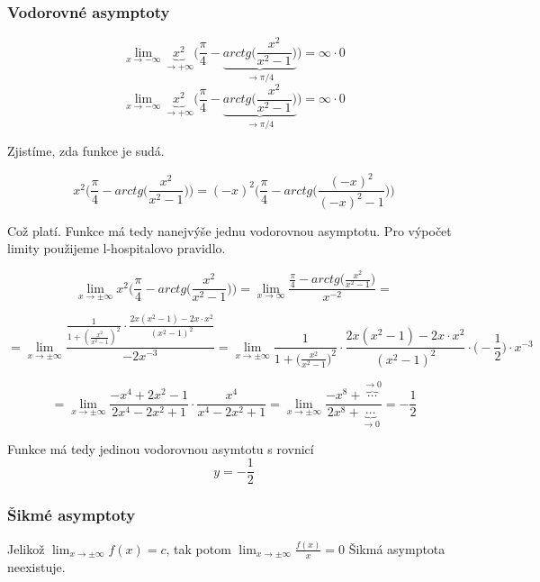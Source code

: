\subsubsection{Vodorovné asymptoty}


\begin{displaymath}
\lim_{x \to - \infty}\underbrace{x^2}_{\rightarrow+\infty}\Big(\frac{\pi}{4}-\underbrace{arctg\Big(\frac{x^2}{x^2-1}\Big)}_{\rightarrow \pi/4}\Big) = \infty \cdot 0
\end{displaymath}
\begin{displaymath}
\lim_{x \to - \infty}\underbrace{x^2}_{\rightarrow+\infty}\Big(\frac{\pi}{4}-\underbrace{arctg\Big(\frac{x^2}{x^2-1}\Big)}_{\rightarrow \pi/4}\Big) = \infty \cdot 0
\end{displaymath}

Zjistíme, zda funkce je sudá.

\begin{displaymath}
x^2\Big(\frac{\pi}{4}-arctg\Big(\frac{x^2}{x^2-1}\Big)\Big) = 
(-x)^2\Big(\frac{\pi}{4}-arctg\Big(\frac{(-x)^2}{(-x)^2-1}\Big)\Big)
\end{displaymath}

Což platí. Funkce má tedy nanejvýše jednu vodorovnou asymptotu. Pro výpočet limity použijeme l-hospitalovo pravidlo.

\begin{displaymath}
\lim_{x \to \pm \infty}x^2\Big(\frac{\pi}{4}-arctg\Big(\frac{x^2}{x^2-1}\Big)\Big) = \lim_{x \to \infty}\frac{\frac{\pi}{4}-arctg\Big(\frac{x^2}{x^2-1}\Big)}{x^{-2}} =
\end{displaymath}

\begin{displaymath}
= \lim_{x \to \pm \infty} \frac{\frac{1}{1+(\frac{x^2}{x^2-1})^2}\cdot\frac{2x(x^2-1)-2x\cdot x^2}{(x^2-1)^2}}{-2x^{-3}} = \lim_{x \to \pm \infty}\frac{1}{1+\Big(\frac{x^2}{x^2-1}\Big)^2}\cdot\frac{2x(x^2-1)-2x\cdot x^2}{(x^2-1)^2} \cdot \Big(-\frac{1}{2}\Big) \cdot x^{-3}
\end{displaymath}

\begin{displaymath}
= \lim_{x \to \pm \infty} \frac{-x^4+2x^2-1}{2x^4-2x^2+1} \cdot \frac{x^4}{x^4-2x^2+1} = \lim_{x \to \pm \infty} \frac {-x^8+ \overbrace{\cdots}^{\rightarrow0}}{2x^8 +\underbrace{\cdots}_{\rightarrow0} } = -\frac{1}{2}
\end{displaymath}

Funkce má tedy jedinou vodorovnou asymtotu s rovnicí
\begin{displaymath}
y = - \frac{1}{2}
\end{displaymath}

\subsubsection{Šikmé asymptoty}

Jelikož $\lim_{x \to \pm \infty} f(x) = c$, tak potom $\lim_{x \to \pm \infty} \frac{f(x)}{x} = 0$ Šikmá asymptota neexistuje. 

